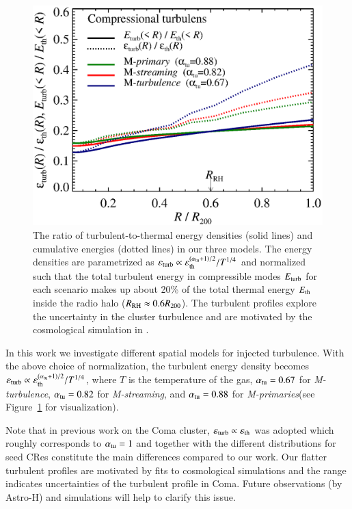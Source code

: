 \documentclass[fleqn,usenatbib,useAMS]{mnras}
\newcommand{\Mstream}{{\it M-streaming}\xspace}
\newcommand{\Mflatturb}{{\it M-turbulence}\xspace}
\newcommand{\Mprimary}{{\it M-primaries}\xspace}
\newcommand{\eps}{\varepsilon}
\begin{document}
\begin{figure}
  \includegraphics[width=1.0\columnwidth]{turb_profile_ratio_tot.eps}
  \caption{The ratio of turbulent-to-thermal energy densities (solid
    lines) and cumulative energies (dotted lines) in our three
    models. The energy densities are parametrized as
    $\eps_\rmn{turb} \propto
    \eps_\rmn{th}^{(\alpha_{\rmn{tu}}+1)/2}/T^{1/4}$ and
    normalized such that the total turbulent energy in compressible
    modes $E_{\mathrm{turb}}$ for each scenario makes up about 20\% of the
    total thermal energy $E_{\mathrm{th}}$ inside the radio halo
    ($R_{\mathrm{RH}}\approx0.6R_{200}$). The turbulent profiles explore
    the uncertainty in the cluster turbulence and are motivated by the
    cosmological simulation in
    \citep{2009ApJ...705.1129L,2010ApJ...725.1452S,2011A&A...529A..17V}.}
  \label{fig:turb}
\end{figure}

In this work we investigate
different spatial models for injected turbulence. With the above
choice of normalization, the turbulent energy density becomes
$\eps_\rmn{turb} \propto
\eps_\rmn{th}^{(\alpha_\rmn{tu}+1)/2}/T^{1/4}$, where $T$ is the
temperature of the gas, $\alpha_{\mathrm{tu}}= 0.67$ for \Mflatturb,
$\alpha_{\mathrm{tu}}= 0.82$ for \Mstream, and $\alpha_{\mathrm{tu}}= 0.88$ for
\Mprimary (see Figure~\ref{fig:turb} for visualization). 

Note that in previous work on the Coma cluster, $\eps_\rmn{turb}
\propto \eps_\rmn{th}$ was adopted which roughly corresponds to
$\alpha_{\mathrm{tu}}= 1$ \citep{brunetti12} and together with the
different distributions for seed CRes constitute the main differences
compared to our work. Our flatter turbulent profiles are motivated by
fits to cosmological simulations
\citep{2009ApJ...705.1129L,2010ApJ...725.1452S,2011A&A...529A..17V,2012ApJ...758...74B}
and the range indicates uncertainties of the turbulent profile in
Coma. Future observations (by Astro-H) and simulations will help to
clarify this issue.
\end{document}
